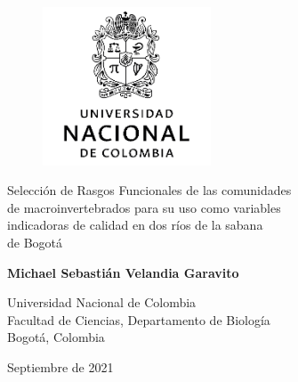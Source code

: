
\thispagestyle{empty}
	
	\begin{figure}[ht]
	   \centering
			\includegraphics[width=5cm]{unal.png}
			\label{EscudoUNAL}
	\end{figure}
	
	\begin{center}
	\vspace{0.5cm}
	\LARGE
	Selección de Rasgos Funcionales de las comunidades \\
	de macroinvertebrados para su uso como variables \\
	indicadoras de  calidad en dos ríos de la sabana \\
	de Bogotá
	
	\vspace{2.5cm}
	\Large
	\textbf{Michael Sebastián Velandia Garavito}

	\vspace{4.5cm}
	\normalsize
	Universidad Nacional de Colombia \\
    Facultad de Ciencias, Departamento de Biología\\
    Bogotá, Colombia
	

	\vspace{.5cm}
	\normalsize
	Septiembre de 2021
	
	\vspace{1cm}
	\end{center}

\newpage	
\thispagestyle{empty}
	
